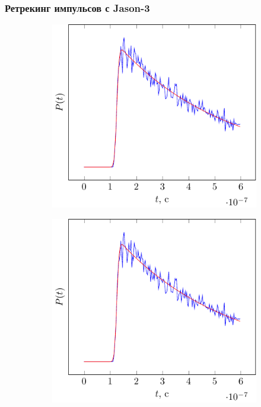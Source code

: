 \documentclass[10pt,pdf,hyperref={unicode}, dvipsnames]{beamer}
\begin{document}
\begin{frame}
\frametitle{Ретрекинг импульсов с Jason-3}
\vskip -3pt
\begin{figure}[ht]
    \centering
    \begin{subfigure}{0.42\linewidth}
        \centering
        \includegraphics[width=\linewidth, page=4]{fig/retracking5}
    \end{subfigure}
    \begin{subfigure}{0.42\linewidth}
        \centering
        \includegraphics[width=\linewidth, page=5]{fig/retracking5}

\end{subfigure}
\end{figure}
\end{frame}
\end{document}

